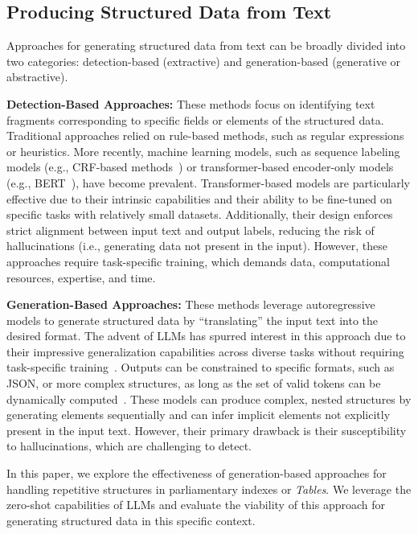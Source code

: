 \subsection{Producing Structured Data from Text}
\label{sec:producing-structured-data}

Approaches for generating structured data from text can be broadly divided into two categories: detection-based (extractive) and generation-based (generative or abstractive).

\textbf{Detection-Based Approaches:}  
These methods focus on identifying text fragments corresponding to specific fields or elements of the structured data. Traditional approaches relied on rule-based methods, such as regular expressions or heuristics. More recently, machine learning models, such as sequence labeling models (e.g., CRF-based methods~\cite{finkel_incorporating_2005}) or transformer-based encoder-only models (e.g., BERT~\cite{devlin-etal-2019-bert}), have become prevalent. Transformer-based models are particularly effective due to their intrinsic capabilities and their ability to be fine-tuned on specific tasks with relatively small datasets. Additionally, their design enforces strict alignment between input text and output labels, reducing the risk of hallucinations (i.e., generating data not present in the input). However, these approaches require task-specific training, which demands data, computational resources, expertise, and time.

\textbf{Generation-Based Approaches:}  
These methods leverage autoregressive models to generate structured data by ``translating'' the input text into the desired format. The advent of LLMs has spurred interest in this approach due to their impressive generalization capabilities across diverse tasks without requiring task-specific training~\cite{radford_improving_2018,radford_language_2019,brown_language_2020}. Outputs can be constrained to specific formats, such as JSON, or more complex structures, as long as the set of valid tokens can be dynamically computed~\cite{willard2023efficient}. These models can produce complex, nested structures by generating elements sequentially and can infer implicit elements not explicitly present in the input text. However, their primary drawback is their susceptibility to hallucinations, which are challenging to detect.

In this paper, we explore the effectiveness of generation-based approaches for handling repetitive structures in parliamentary indexes or \textit{Tables}. We leverage the zero-shot capabilities of LLMs and evaluate the viability of this approach for generating structured data in this specific context.

